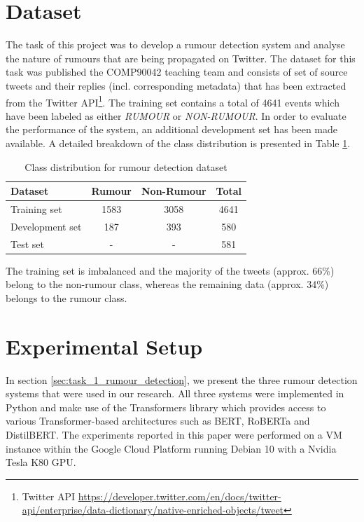 \documentclass[11pt,a4paper]{article}
\begin{document}
\section{Dataset}
The task of this project was to develop a rumour detection system and analyse the nature of rumours that are being propagated on Twitter.
The dataset for this task was published the COMP90042 teaching team and consists of set of source tweets and their replies (incl. corresponding metadata) that has been extracted from the Twitter API\footnote{Twitter API \url{https://developer.twitter.com/en/docs/twitter-api/enterprise/data-dictionary/native-enriched-objects/tweet}}.
The training set contains a total of 4641 events which have been labeled as either \textit{RUMOUR} or \textit{NON-RUMOUR}. In order to evaluate the performance of the system, an additional development set has been made available. A detailed breakdown of the class distribution is presented in Table \ref{tab:dataset_class_distribution}.
\begin{table}
\centering
\setlength\tabcolsep{2pt}
\begin{tabular}{lccc}
\hline
\textbf{Dataset}         & Rumour & Non-Rumour & Total \\ \hline
Training set    & 1583   & 3058       & 4641  \\
Development set & 187    & 393        & 580   \\
Test set        & -      & -          & 581   \\ \hline
\end{tabular}
\caption{Class distribution for rumour detection dataset}
\label{tab:dataset_class_distribution}
\end{table}
The training set is imbalanced and the majority of the tweets (approx. 66\%) belong to the non-rumour class, whereas the remaining data (approx. 34\%) belongs to the rumour class.

\section{Experimental Setup}
In section \ref{sec:task_1_rumour_detection}, we present the three rumour detection systems that were used in our research.
All three systems were implemented in Python and make use of the Transformers library \citep{RN682} which provides access to various Transformer-based architectures such as BERT, RoBERTa and DistilBERT. 
\newline
The experiments reported in this paper were performed on a VM instance within the Google Cloud Platform running Debian 10 with a Nvidia Tesla K80 GPU.
\end{document}
